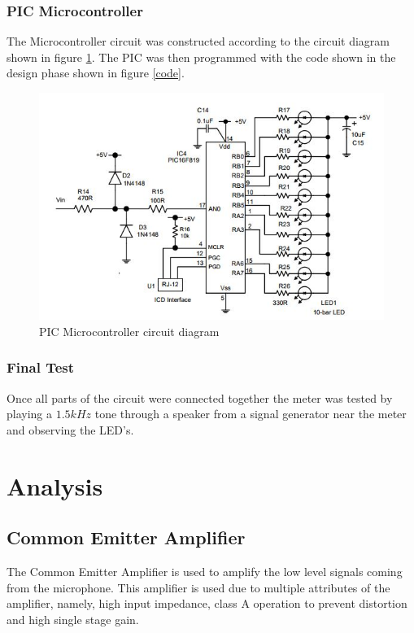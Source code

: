 \documentclass[10pt,a4paper]{article}
\begin{document}
\subsubsection{PIC Microcontroller}
The Microcontroller circuit was constructed according to the circuit diagram shown in figure \ref{PIC}. The PIC was then programmed with the code shown in the design phase shown in figure \ref{code}.

\begin{figure}
\includegraphics[width = \textwidth]{PIC}
\caption{PIC Microcontroller circuit diagram}
\label{PIC}
\end{figure} 

\subsubsection{Final Test}
Once all parts of the circuit were connected together the meter was tested by playing a $1.5kHz$ tone through a speaker from a signal generator near the meter and observing the LED's.







\section{Analysis}
\subsection{Common Emitter Amplifier}
The Common Emitter Amplifier is used to amplify the low level signals coming from the microphone. This amplifier is used due to multiple attributes of the amplifier, namely, high input impedance, class A operation to prevent distortion and high single stage gain.
\end{document}
